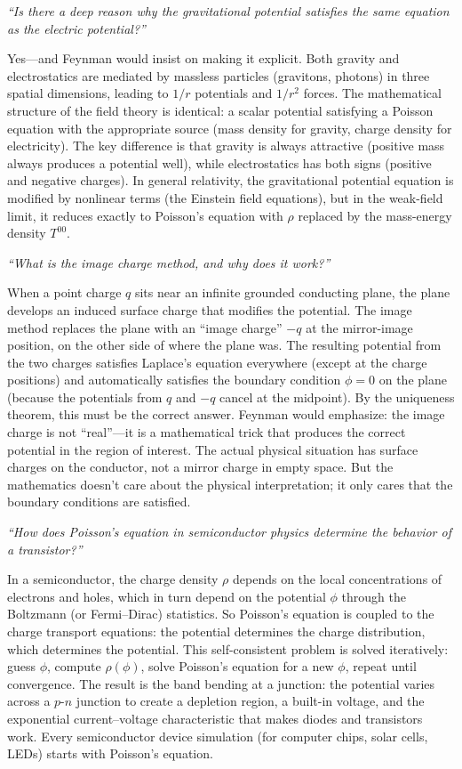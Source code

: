 \textit{``Is there a deep reason why the gravitational potential satisfies the same equation as the electric potential?''}

Yes---and Feynman would insist on making it explicit. Both gravity and electrostatics are mediated by massless particles (gravitons, photons) in three spatial dimensions, leading to $1/r$ potentials and $1/r^2$ forces. The mathematical structure of the field theory is identical: a scalar potential satisfying a Poisson equation with the appropriate source (mass density for gravity, charge density for electricity). The key difference is that gravity is always attractive (positive mass always produces a potential well), while electrostatics has both signs (positive and negative charges). In general relativity, the gravitational potential equation is modified by nonlinear terms (the Einstein field equations), but in the weak-field limit, it reduces exactly to Poisson's equation with $\rho$ replaced by the mass-energy density $T^{00}$.

\textit{``What is the image charge method, and why does it work?''}

When a point charge $q$ sits near an infinite grounded conducting plane, the plane develops an induced surface charge that modifies the potential. The image method replaces the plane with an ``image charge'' $-q$ at the mirror-image position, on the other side of where the plane was. The resulting potential from the two charges satisfies Laplace's equation everywhere (except at the charge positions) and automatically satisfies the boundary condition $\phi = 0$ on the plane (because the potentials from $q$ and $-q$ cancel at the midpoint). By the uniqueness theorem, this must be the correct answer. Feynman would emphasize: the image charge is not ``real''---it is a mathematical trick that produces the correct potential in the region of interest. The actual physical situation has surface charges on the conductor, not a mirror charge in empty space. But the mathematics doesn't care about the physical interpretation; it only cares that the boundary conditions are satisfied.

\textit{``How does Poisson's equation in semiconductor physics determine the behavior of a transistor?''}

In a semiconductor, the charge density $\rho$ depends on the local concentrations of electrons and holes, which in turn depend on the potential $\phi$ through the Boltzmann (or Fermi--Dirac) statistics. So Poisson's equation is coupled to the charge transport equations: the potential determines the charge distribution, which determines the potential. This self-consistent problem is solved iteratively: guess $\phi$, compute $\rho(\phi)$, solve Poisson's equation for a new $\phi$, repeat until convergence. The result is the band bending at a junction: the potential varies across a $p$-$n$ junction to create a depletion region, a built-in voltage, and the exponential current--voltage characteristic that makes diodes and transistors work. Every semiconductor device simulation (for computer chips, solar cells, LEDs) starts with Poisson's equation.


